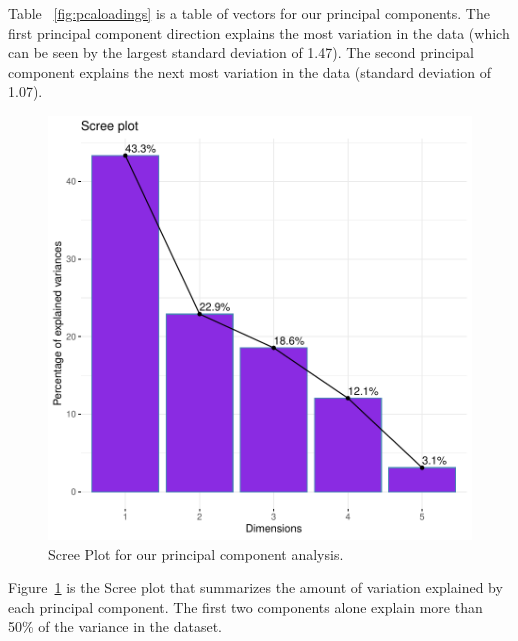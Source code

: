 Table ~\ref{fig:pcaloadings} is a table of vectors for our principal components. The first principal component direction explains the most variation in the data (which can be seen by the largest standard deviation of 1.47). The second principal component explains the next most variation in the data (standard deviation of 1.07).
\begin{figure}[H]
\includegraphics{Chapter5Images/scree.pdf}
\caption{\hspace{3mm} Scree Plot for our principal component analysis.}
\label{fig:scree}
\end{figure}

Figure~\ref{fig:scree} is the Scree plot that summarizes the amount of variation explained by each principal component. The first two components alone explain more than 50\% of the variance in the dataset.

